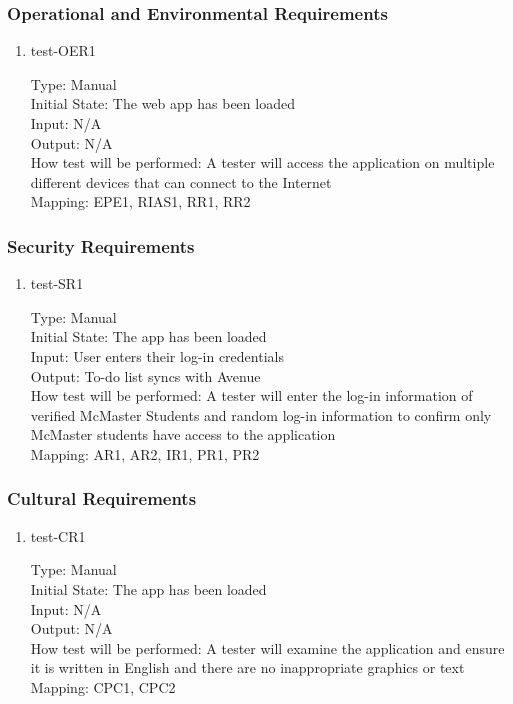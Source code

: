 \documentclass[12pt, titlepage]{article}
\begin{document}
\subsubsection{Operational and Environmental Requirements}

\begin{enumerate}
\item{test-OER1\\}

Type: Manual\\
Initial State: The web app has been loaded\\
Input: N/A\\
Output: N/A\\
How test will be performed: A tester will access the application on multiple different devices that can connect to the Internet\\
Mapping: EPE1, RIAS1, RR1, RR2\\
\end{enumerate}

\subsubsection{Security Requirements}

\begin{enumerate}
\item{test-SR1\\}

Type: Manual\\
Initial State: The app has been loaded\\
Input: User enters their log-in credentials\\
Output: To-do list syncs with Avenue\\
How test will be performed: A tester will enter the log-in information of verified McMaster Students and random log-in information to confirm only McMaster students have access to the application\\
Mapping: AR1, AR2, IR1, PR1, PR2\\
\end{enumerate}

\subsubsection{Cultural Requirements}

\begin{enumerate}
\item{test-CR1\\}

Type: Manual\\
Initial State: The app has been loaded\\
Input: N/A\\
Output: N/A\\
How test will be performed: A tester will examine the application and ensure it is written in English and there are no inappropriate graphics or text\\
Mapping: CPC1, CPC2\\
\end{enumerate}
\end{document}
